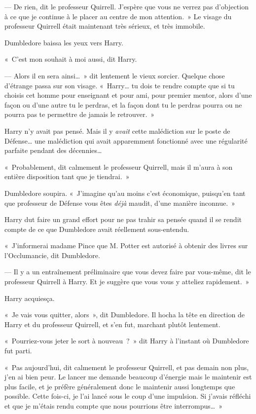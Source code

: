 --- De rien, dit le professeur Quirrell.
J'espère que vous ne verrez pas d'objection à ce que je continue à le placer au centre de mon attention.~»
Le visage du professeur Quirrell était maintenant très sérieux, et très immobile.

Dumbledore baissa les yeux vers Harry.

«~C'est mon souhait à moi aussi, dit Harry.

--- Alors il en sera ainsi…~»
dit lentement le vieux sorcier.
Quelque chose d'étrange passa sur son visage.
«~Harry… tu dois te rendre compte que si tu choisis cet homme pour enseignant et pour ami, pour premier mentor, alors d'une façon ou d'une autre tu le perdras, et la façon dont tu le perdras pourra ou ne pourra pas te permettre de jamais le retrouver.~»

Harry n'y avait pas pensé.
Mais il y \emph{avait} cette malédiction sur le poste de Défense… une malédiction qui avait apparemment fonctionné avec une régularité parfaite pendant des décennies…

«~Probablement, dit calmement le professeur Quirrell, mais il m'aura à son entière disposition tant que je tiendrai.~»

Dumbledore soupira.
«~J'imagine qu'au moins c'est économique, puisqu'en tant que professeur de Défense vous êtes \emph{déjà} maudit, d'une manière inconnue.~»

Harry dut faire un grand effort pour ne pas trahir sa pensée quand il se rendit compte de ce que Dumbledore avait réellement sous-entendu.

«~J'informerai madame Pince que M. Potter est autorisé à obtenir des livres sur l'Occlumancie, dit Dumbledore.

--- Il y a un entraînement préliminaire que vous devez faire par vous-même, dit le professeur Quirrell à Harry.
Et je suggère que vous vous y atteliez rapidement.~»

Harry acquiesça.

«~Je vais vous quitter, alors~», dit Dumbledore.
Il hocha la tête en direction de Harry et du professeur Quirrell, et s'en fut, marchant plutôt lentement.

«~Pourriez-vous jeter le sort à nouveau~?~»
dit Harry à l'instant où Dumbledore fut parti.

«~Pas aujourd'hui, dit calmement le professeur Quirrell, et pas demain non plus, j'en ai bien peur.
Le lancer me demande beaucoup d'énergie mais le maintenir est plus facile, et je préfère généralement donc le maintenir aussi longtemps que possible.
Cette fois-ci, je l'ai lancé sous le coup d'une impulsion.
Si j'avais réfléchi et que je m'étais rendu compte que nous pourrions être interrompus…~»

